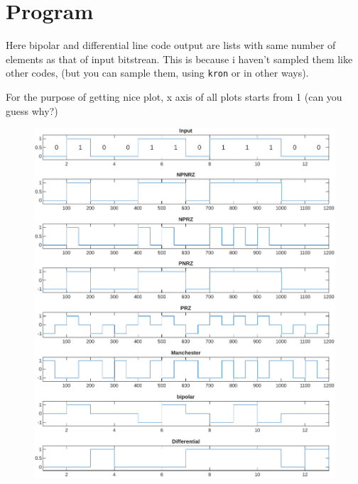 \section*{Program}
Here bipolar and differential line code output are lists with same number of elements as that of input bitstrean.
This is because i haven't sampled them like other codes, (but you can sample them, using \texttt{kron} or in other ways).


For the purpose of getting nice plot, x axis of all plots starts from 1 (can you guess why?)

\begin{figure}[!ht]
	\centering
	\includegraphics[width=0.9\linewidth]{img/linecode.pdf}
\end{figure}